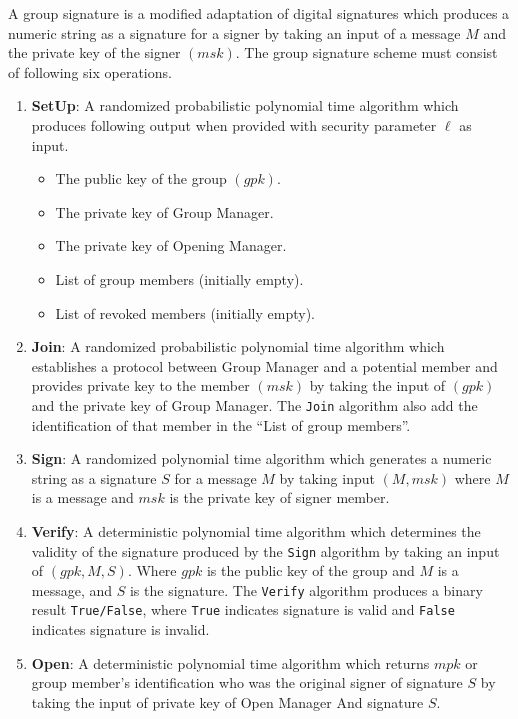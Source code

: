 \begin{definition}\label{def:group signature}
A group signature is a modified adaptation of digital signatures which produces a numeric string as a signature for a signer by taking an input of a message $M$ and the private key of the signer $(msk)$. The group signature scheme must consist of following six operations.

\begin{enumerate}
\item \textbf{SetUp}: A randomized probabilistic polynomial time algorithm which produces following output when provided with security parameter $\ell$ as input.
	\begin{itemize}
	\item The public key of the group $(gpk)$.
	\item The private key of Group Manager.
	\item The private key of Opening Manager.
	\item List of group members (initially empty).
	\item List of revoked members (initially empty).
	\end{itemize}

\item \textbf{Join}: A randomized probabilistic polynomial time algorithm which establishes a protocol between Group Manager and a potential member and provides private key to the member $(msk)$ by taking the input of $(gpk)$ and the private key of Group Manager. The \texttt{Join} algorithm also add the identification of that member in the \textquotedblleft List of group members\textquotedblright.

\item \textbf{Sign}: A randomized polynomial time algorithm which generates a numeric string as a signature $S$ for a message $M$ by taking input $(M, msk)$ where $M$ is a message and $msk$ is the private key of signer member.

\item \textbf{Verify}: A deterministic polynomial time algorithm which determines the validity of the signature produced by the \texttt{Sign} algorithm by taking an input of $(gpk, M, S)$. Where $gpk$ is the public key of the group and $M$ is a message, and $S$ is the signature. The \texttt{Verify} algorithm produces a binary result \texttt{True/False}, where \texttt{True} indicates signature is valid and \texttt{False} indicates signature is invalid.

\item \textbf{Open}: A deterministic polynomial time algorithm which returns $mpk$ or group member's identification who was the original signer of signature $S$ by taking the input of private key of Open Manager And signature $S$.


\end{enumerate}
\end{definition}
